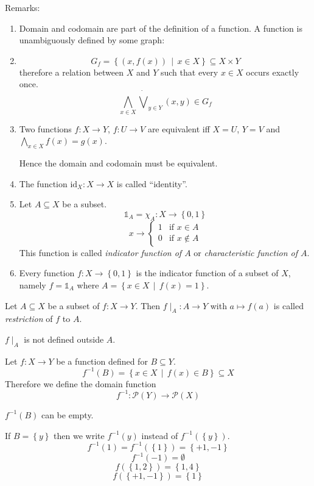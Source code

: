 \documentclass[a4paper,landscape,twocolumn]{article}
\newcommand\set[1]{\left\{#1\right\}}
\newcommand\setdef[2]{\left\{#1\,\middle|\,#2\right\}}
\begin{document}
Remarks:
\begin{enumerate}
  \item
    Domain and codomain are part of the definition of a function.
    A function is unambiguously defined by some graph:

  \item
    \[ G_f = \setdef{(x, f(x))}{x \in X} \subseteq X \times Y \]
    therefore a relation between $X$ and $Y$ such that every $x \in X$
    occurs exactly once.
    \[ \bigwedge_{x\in X} \dot\bigvee_{y\in Y} (x,y) \in G_f \]

  \item
    Two functions $f: X \rightarrow Y$, $f: U \rightarrow V$ are
    equivalent iff $X = U$, $Y = V$ and $\bigwedge_{x \in X} f(x) = g(x)$.

    Hence the domain and codomain must be equivalent.

  \item
    The function $\text{id}_X: X \rightarrow X$ is called \enquote{identity}.

  \item
    Let $A \subseteq X$ be a subset.
    \[ \mathbb{1}_A = \chi_A: X \rightarrow \set{0,1} \]
    \[
       x \rightarrow \begin{cases}
         1 & \text{if } x \in A \\
         0 & \text{if } x \notin A
       \end{cases}
    \]
    This function is called \emph{indicator function of $A$}
    or \emph{characteristic function of $A$}.

  \item
    Every function $f: X \rightarrow \set{0,1}$ is the indicator
    function of a subset of $X$, namely $f = \mathbb{1}_A$
    where $A = \setdef{x \in X}{f(x) = 1}$.
\end{enumerate}

Let $A \subseteq X$ be a subset of $f: X \rightarrow Y$.
Then $f\mid_A: A \rightarrow Y$ with $a \mapsto f(a)$ is
called \emph{restriction} of $f$ to $A$.

$f\mid_A$ is not defined outside $A$.

Let $f: X \rightarrow Y$ be a function defined for $B \subseteq Y$.
\[ f^{-1}(B) = \setdef{x \in X}{f(x) \in B} \subseteq X \]
Therefore we define the domain function
\[ f^{-1}: \mathcal{P}(Y) \rightarrow \mathcal{P}(X) \]

$f^{-1}(B)$ can be empty.

If $B = \set{y}$ then we write $f^{-1}(y)$ instead of $f^{-1}(\set{y})$.
\[ f^{-1}(1) = f^{-1}(\set{1}) = \set{+1, -1} \]
\[ f^{-1}(-1) = \emptyset \]
\[ f(\set{1, 2}) = \set{1,4} \]
\[ f(\set{+1, -1}) = \set{1} \]
\end{document}
